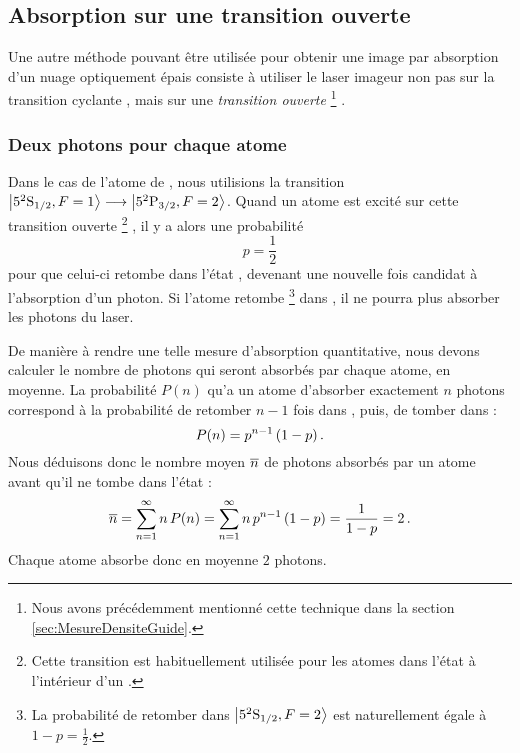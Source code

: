 %


\casse


\subsection{Absorption sur une transition ouverte}\label{sec:ImagerieFun}

Une autre méthode pouvant être utilisée pour obtenir une image par absorption d'un nuage optiquement épais consiste à utiliser le laser imageur non pas sur la transition cyclante%
, mais sur une \emph{transition ouverte}%
\footnote{Nous avons précédemment mentionné cette technique dans la section \vref{sec:MesureDensiteGuide}.}%
. 

\subsubsection{Deux photons pour chaque atome}
\noindent Dans le cas de l'atome de \Rb, nous utilisions la transition ${{{\left| {{5^2 {\rm S}_{{1}/{2}}}, F=1 } \right\rangle}} \longrightarrow {{\left| {{\ensuremath{5^2 {\rm P}_{{3}/{2}}}}, F=2 } \right\rangle}}}$.
Quand un atome est excité sur cette transition ouverte%
\footnote{Cette transition est habituellement utilisée pour  les atomes dans l'état  à l'intérieur d'un \pmo.}%
, il y a alors une probabilité 
\[
p = \frac{1}{2}
\]
pour que celui-ci retombe dans l'état , devenant une nouvelle fois candidat à l'absorption d'un photon. Si l'atome retombe%
\footnote{La probabilité de retomber dans ${{\left| {{5^2 {\rm S}_{{1}/{2}}}, F=2 } \right\rangle}}$ est naturellement égale à $1-p= \frac{1}{2}$.}
 dans , il ne pourra plus absorber les photons du laser. 

De manière à rendre une telle mesure d'absorption quantitative, nous devons calculer le nombre de photons qui seront absorbés par chaque atome, en moyenne. La probabilité $P(n)$ qu'a un atome d'absorber exactement $n$ photons correspond à la probabilité de retomber $n-1$ fois dans , puis, de tomber dans :
\[
P(n) = p^{n-1}\,(1-p)
\, .
\]
\Resultat
{
Nous déduisons donc le nombre moyen $\overline{n}$ de photons absorbés par un atome avant qu'il ne tombe dans l'état :
\[
\overline{n} 
= \sum_{n=1}^{\infty} n\,P(n) 
= \sum_{n=1}^{\infty} n\,p^{n-1}\,(1-p) 
= \frac{1}{1-p} 
= 2
\, .
\]
Chaque atome absorbe donc en moyenne $2$ photons.
}	


